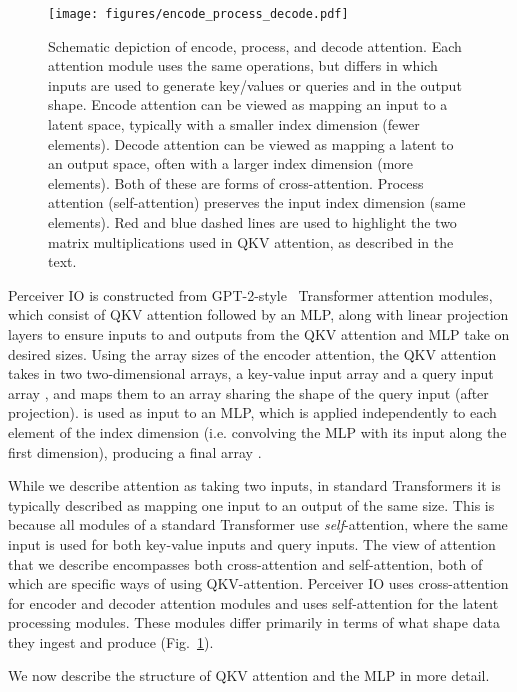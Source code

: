 \documentclass{article} \usepackage{iclr2022_conference,times}
\newcommand{\ourmodel}{Perceiver IO\xspace}
\begin{document}
\begin{figure}[t]
    \centering
    \texttt{[image: figures/encode\_process\_decode.pdf]}
    \caption{Schematic depiction of encode, process, and decode attention. Each attention module uses the same operations, but differs in which inputs are used to generate key/values or queries and in the output shape. Encode attention can be viewed as mapping an input to a latent space, typically with a smaller index dimension (fewer elements). Decode attention can be viewed as mapping a latent to an output space, often with a larger index dimension (more elements). Both of these are forms of cross-attention. Process attention (self-attention) preserves the input index dimension (same elements). Red and blue dashed lines are used to highlight the two matrix multiplications used in QKV attention, as described in the text.}
    \label{fig:encode_process_decode}
    \vspace{-8pt}
\end{figure}

\ourmodel{} is constructed from GPT-2-style~\citep{radford2019language} Transformer attention modules, which consist of QKV attention followed by an MLP, along with linear projection layers to ensure inputs to and outputs from the QKV attention and MLP take on desired sizes. Using the array sizes of the encoder attention, the QKV attention takes in two two-dimensional arrays, a key-value input array  and a query input array , and maps them to an array  sharing the shape of the query input (after projection).  is used as input to an MLP, which is applied independently to each element of the index dimension (i.e. convolving the MLP with its input along the first dimension), producing a final array .

While we describe attention as taking two inputs, in standard Transformers it is typically described as mapping one input to an output of the same size. This is because all modules of a standard Transformer use \textit{self}-attention, where the same input is used for both key-value inputs and query inputs. The view of attention that we describe encompasses both cross-attention and self-attention, both of which are specific ways of using QKV-attention. \ourmodel{} uses cross-attention for encoder and decoder attention modules and uses self-attention for the latent processing modules. These modules differ primarily in terms of what shape data they ingest and produce (Fig.~\ref{fig:encode_process_decode}). 

We now describe the structure of QKV attention and the MLP in more detail.
\end{document}
